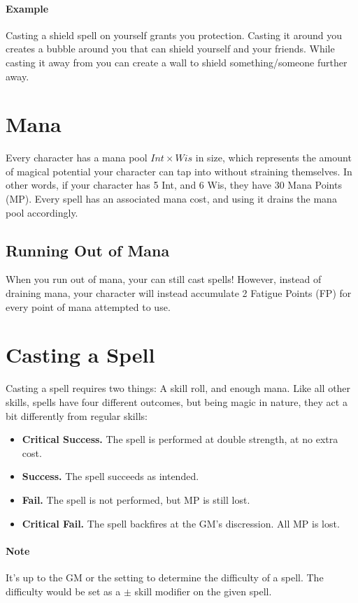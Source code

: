 \paragraph{Example} Casting a shield spell on yourself grants you protection.
Casting it around you creates a bubble around you that can shield yourself and your friends.
While casting it away from you can create a wall to shield something/someone further away.

\section{Mana}\label{sec:mana}
Every character has a mana pool $Int \times Wis$ in size, which represents the amount of magical potential your character can tap into without straining themselves.
In other words, if your character has 5 Int, and 6 Wis, they have 30 Mana Points (MP).
Every spell has an associated mana cost, and using it drains the mana pool accordingly.

\subsection{Running Out of Mana}
When you run out of mana, your can still cast spells!
However, instead of draining mana, your character will instead accumulate 2 Fatigue Points (FP) for every point of mana attempted to use.

\section{Casting a Spell}
Casting a spell requires two things: A skill roll, and enough mana.
Like all other skills, spells have four different outcomes, but being magic in nature, they act a bit differently from regular skills:
\begin{itemize}
\item \textbf{Critical Success.} The spell is performed at double strength, at no extra cost.
\item \textbf{Success.} The spell succeeds as intended.
\item \textbf{Fail.} The spell is not performed, but MP is still lost.
\item \textbf{Critical Fail.} The spell backfires at the GM's discression. All MP is lost.
\end{itemize}

\paragraph{Note} It's up to the GM or the setting to determine the difficulty of a spell.
The difficulty would be set as a $\pm$ skill modifier on the given spell.

